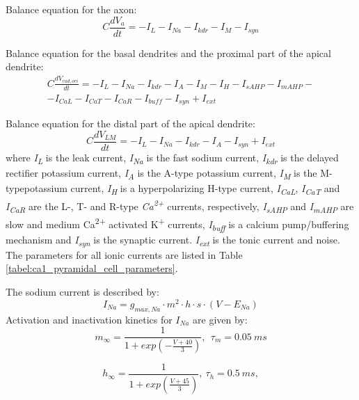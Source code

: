\documentclass[a4paper,12pt]{article}
\begin{document}
Balance equation for the axon:
\begin{equation}
C\frac{dV_a}{dt}=-I_L-I_{Na}-I_{kdr}-I_M-I_{syn}
\end{equation}

Balance equation for the basal dendrites and the proximal part of the apical dendrite:
\begin{eqnarray}
C\frac{dV_{rad,ori}}{dt} =-I_L-I_{Na}-I_{kdr}-I_A-I_M-I_H-I_{sAHP}-I_{mAHP}- \nonumber \\-I_{CaL}-I_{CaT}-I_{CaR}-I_{buff}-I_{syn}+I_{ext}
\end{eqnarray}

Balance equation for the distal part of the apical dendrite:
\begin{equation}
C\frac{dV_{LM}}{dt}=-I_L-I_{Na}-I_{kdr}-I_A-I_{syn}+I_{ext}
\end{equation}
where \textit{I\textsubscript{L}} is the leak current,  \textit{I\textsubscript{Na}} is the fast sodium current, \textit{I\textsubscript{kdr}} is the delayed rectifier potassium current, \textit{I\textsubscript{A}} is the A-type potassium current, \textit{I\textsubscript{M}}
is the M-typepotassium current, \textit{I\textsubscript{H}} is a hyperpolarizing H-type current,
\textit{I\textsubscript{CaL}}, \textit{I\textsubscript{CaT}} and
\textit{I\textsubscript{CaR}} are the L-, T- and R-type \textit{Ca\textsuperscript{2+}} currents, respectively,
\textit{I\textsubscript{sAHP}} and \textit{I\textsubscript{mAHP}} are
slow and medium Ca\textsuperscript{2+} activated K\textsuperscript{+} currents,\textit{ I\textsubscript{buff}}
is a calcium pump/buffering mechanism and \textit{I\textsubscript{syn}} is the synaptic current. \textit{ I\textsubscript{ext}} is the tonic current and noise. The
parameters for all ionic currents are listed in Table \ref{tabel:ca1_pyramidal_cell_parameters}. \par
The sodium current is described by:
\begin{equation}
I_{Na}= g_{max, Na}\cdot m^2\cdot h\cdot s\cdot (V-E_{Na})
\end{equation}
Activation and inactivation kinetics for ${I_{Na}}$ are given by:
\begin{equation}
m_{\infty}=\frac {1}{1+exp(-\frac{V+40} {3})} , \ \ \tau_m=0.05 \ ms
\end{equation}

\begin{equation}
h_{\infty}=\frac {1}{1+exp(\frac{V+45}{3})},  \  \tau_h = 0.5 \ ms,
\end{equation}
\end{document}
